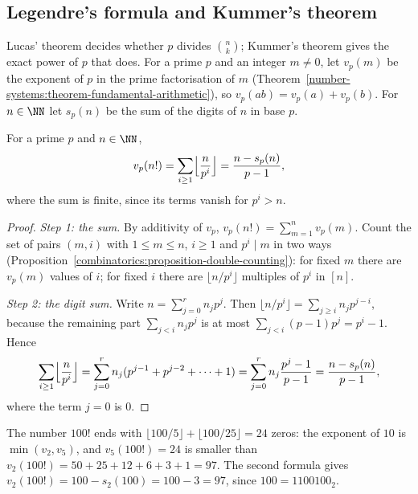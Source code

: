 \subsection{Legendre's formula and Kummer's theorem}\label{combinatorics:subsection-kummer}

Lucas' theorem decides whether $p$ divides $\binom{n}{k}$; Kummer's theorem gives the exact power of $p$ that does. For a prime $p$ and an integer $m \neq 0$, let $v_p(m)$ be the exponent of $p$ in the
prime factorisation of $m$ (Theorem~\ref{number-systems:theorem-fundamental-arithmetic}), so $v_p(ab) = v_p(a) + v_p(b)$. For $n \in \NN$ let $s_p(n)$ be the sum of the digits of $n$ in base $p$.

\begin{theorem}\label{combinatorics:theorem-legendre}
For a prime $p$ and $n \in \NN$,
\[
v_p(n!) = \sum_{i \geq 1}\Bigl\lfloor\frac{n}{p^i}\Bigr\rfloor = \frac{n - s_p(n)}{p - 1},
\]
where the sum is finite, since its terms vanish for $p^i > n$.
\end{theorem}

\begin{proof}
\emph{Step 1: the sum.} By additivity of $v_p$, $v_p(n!) = \sum_{m=1}^{n}v_p(m)$. Count the set of pairs $(m, i)$ with $1 \leq m \leq n$, $i \geq 1$ and $p^i \mid m$ in two ways
(Proposition~\ref{combinatorics:proposition-double-counting}): for fixed $m$ there are $v_p(m)$ values of $i$; for fixed $i$ there are $\lfloor n/p^i \rfloor$ multiples of $p^i$ in $[n]$.

\emph{Step 2: the digit sum.} Write $n = \sum_{j=0}^{r}n_jp^j$. Then $\lfloor n/p^i \rfloor = \sum_{j \geq i}n_jp^{j-i}$, because the remaining part $\sum_{j < i}n_jp^j$ is at most
$\sum_{j<i}(p - 1)p^j = p^i - 1$. Hence
\[
\sum_{i \geq 1}\Bigl\lfloor\frac{n}{p^i}\Bigr\rfloor = \sum_{j=0}^{r}n_j(p^{j-1} + p^{j-2} + \cdots + 1) = \sum_{j=0}^{r}n_j\frac{p^j - 1}{p - 1} = \frac{n - s_p(n)}{p - 1},
\]
where the term $j = 0$ is $0$.
\end{proof}

\begin{example}\label{combinatorics:example-legendre}
The number $100!$ ends with $\lfloor 100/5 \rfloor + \lfloor 100/25 \rfloor = 24$ zeros: the exponent of $10$ is $\min(v_2, v_5)$, and $v_5(100!) = 24$ is smaller than
$v_2(100!) = 50 + 25 + 12 + 6 + 3 + 1 = 97$. The second formula gives $v_2(100!) = 100 - s_2(100) = 100 - 3 = 97$, since $100 = 1100100_2$.
\end{example}

